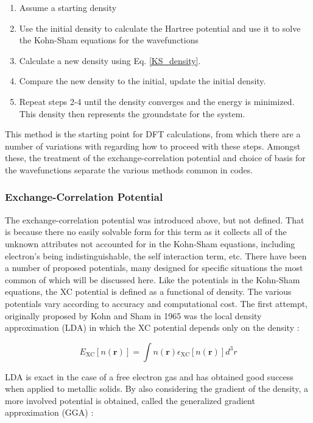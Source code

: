 \begin{enumerate}
	\item Assume a starting density
	\item Use the initial density to calculate the Hartree potential and use it to solve the Kohn-Sham equations for the wavefunctions
	\item Calculate a new density using Eq. \ref{KS_density}.
	\item Compare the new density to the initial, update the initial density. 
	\item Repeat steps 2-4 until the density converges and the energy is minimized. This density then represents the groundstate for the system.
\end{enumerate}

This method is the starting point for DFT calculations, from which there are a number of  variations with regarding how to proceed with these steps.  Amongst these, the treatment of the exchange-correlation potential and choice of basis for the wavefunctions separate the various methods common in codes.  


\subsubsection{Exchange-Correlation Potential}
The exchange-correlation potential was introduced above, but not defined.  That is because there no easily solvable form for this term as it collects all of the unknown attributes not accounted for in the Kohn-Sham equations, including electron's being indistinguishable, the self interaction term, etc.   There have been a number of proposed potentials, many designed for specific situations the most common of which will be discussed here.  Like the potentials in the Kohn-Sham equations, the XC potential is defined as a functional of density.  The various potentials vary according to accuracy and computational cost.  The first attempt, originally proposed by Kohn and Sham in 1965 was the local density approximation (LDA) in which the XC potential depends only on the density \cite{tao_climbing_2003, ks_1965}: 

\begin{equation}
	E_{\mathrm{XC}}[n(\textbf{r})] = \int  n(\textbf{r}) \epsilon_{\mathrm{XC}}[n(\textbf{r})] d^3r
\end{equation}

LDA is exact in the case of a free electron gas and has obtained good success when applied to metallic solids.  By also considering the gradient of the density, a more involved potential is obtained, called the generalized gradient approximation (GGA) \cite{tao_climbing_2003,perdew_wang} : 


